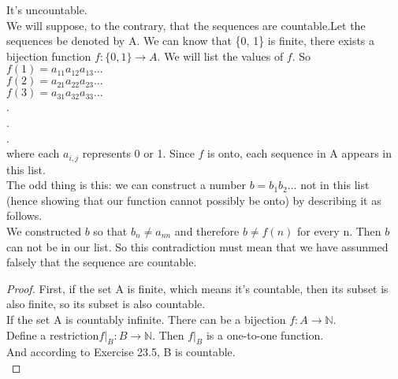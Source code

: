 \documentclass[a4paper, justified]{tufte-handout}
\begin{document}
\begin{problem}[UD Problem 23.4]
\end{problem}

\begin{solution}
  It's uncountable.\\
  We will suppose, to the contrary, that the sequences are countable.Let the sequences be denoted by A. We can know that \{0, 1\} is finite, there exists a bijection function $f:\{0, 1\} \rightarrow A$. We will list the values of $f$. So\\
  $f(1) = a_{11}a_{12}a_{13}...$\\
  $f(2) = a_{21}a_{22}a_{23}...$\\
  $f(3) = a_{31}a_{32}a_{33}...$\\
  .\\
  .\\
  .\\
  where each $a_{i, j}$ represents 0 or 1. Since $f$ is onto, each sequence in A appears in this list.\\
  The odd thing is this: we can construct a number $b = b_1b_2...$ not in this list  (hence showing that our function cannot possibly be onto) by describing it as follows.\\
  We constructed $b$ so that $b_n \neq a_{nn}$ and therefore $b \neq f(n)$ for every n. Then $b$ can not be in our list. So this contradiction must mean that we have assunmed falsely that the sequence are countable.\\
\end{solution}

\begin{problem}[UD Problem 23.9]
\end{problem}

\begin{proof}
  First, if the set A is finite, which means it's countable, then its subset is also finite, so its subset is also countable.\\
  If the set A is countably infinite. There can be a bijection $f:A \rightarrow \mathbb{N} $. \\
  Define a restriction$f|_{B}:B \rightarrow \mathbb{N}$. Then $f|_{B}$ is a one-to-one function. \\
  And according to Exercise 23.5, B is countable.\\
\end{proof}

\begin{problem}[UD Problem 23.12]
\end{problem}
\end{document}
